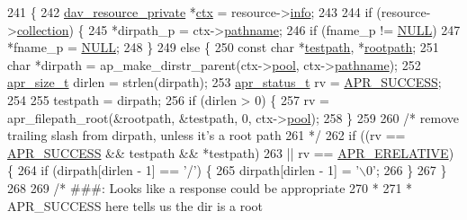 \begin{DoxyCode}
241 \{
242     \hyperlink{structdav__resource__private}{dav\_resource\_private} *\hyperlink{group__APACHE__CORE__FILTER_ga94af791485570bea922969fef12d6259}{ctx} = resource->\hyperlink{structdav__resource_a27ebc9fd0931a822c97babe929e92ffb}{info};
243 
244     \textcolor{keywordflow}{if} (resource->\hyperlink{structdav__resource_ac46ba5f33cdeec0bd1cccd8e548e3057}{collection}) \{
245         *dirpath\_p = ctx->\hyperlink{structdav__resource__private_a9221c2df9f33ac585e096b6a6963cf27}{pathname};
246         \textcolor{keywordflow}{if} (fname\_p != \hyperlink{pcre_8txt_ad7f989d16aa8ca809a36bc392c07fba1}{NULL})
247             *fname\_p = \hyperlink{pcre_8txt_ad7f989d16aa8ca809a36bc392c07fba1}{NULL};
248     \}
249     \textcolor{keywordflow}{else} \{
250         \textcolor{keyword}{const} \textcolor{keywordtype}{char} *\hyperlink{testpath_8c_a267b428030159c6ae57a9070b54e823a}{testpath}, *\hyperlink{group__apr__filepath_ga5e93c5b47952eec88fe4251b4f1a228f}{rootpath};
251         \textcolor{keywordtype}{char} *dirpath = ap\_make\_dirstr\_parent(ctx->\hyperlink{structdav__resource__private_ad180911d49f61626aef32667f087fa33}{pool}, ctx->\hyperlink{structdav__resource__private_a9221c2df9f33ac585e096b6a6963cf27}{pathname});
252         \hyperlink{group__apr__platform_gaaa72b2253f6f3032cefea5712a27540e}{apr\_size\_t} dirlen = strlen(dirpath);
253         \hyperlink{group__apr__errno_gaa5105fa83cc322f09382292db8b47593}{apr\_status\_t} rv = \hyperlink{group__apr__errno_ga9ee311b7bf1c691dc521d721339ee2a6}{APR\_SUCCESS};
254 
255         testpath = dirpath;
256         \textcolor{keywordflow}{if} (dirlen > 0) \{
257             rv = apr\_filepath\_root(&rootpath, &testpath, 0, ctx->\hyperlink{structdav__resource__private_ad180911d49f61626aef32667f087fa33}{pool});
258         \}
259 
260         \textcolor{comment}{/* remove trailing slash from dirpath, unless it's a root path}
261 \textcolor{comment}{         */}
262         \textcolor{keywordflow}{if} ((rv == \hyperlink{group__apr__errno_ga9ee311b7bf1c691dc521d721339ee2a6}{APR\_SUCCESS} && testpath && *testpath)
263             || rv == \hyperlink{group__APR__Error_gae4688dfa866265b9ec3623689c23923b}{APR\_ERELATIVE}) \{
264             \textcolor{keywordflow}{if} (dirpath[dirlen - 1] == \textcolor{charliteral}{'/'}) \{
265                 dirpath[dirlen - 1] = \textcolor{charliteral}{'\(\backslash\)0'};
266             \}
267         \}
268 
269         \textcolor{comment}{/* ###: Looks like a response could be appropriate}
270 \textcolor{comment}{         *}
271 \textcolor{comment}{         * APR\_SUCCESS     here tells us the dir is a root}

\end{DoxyCode}
